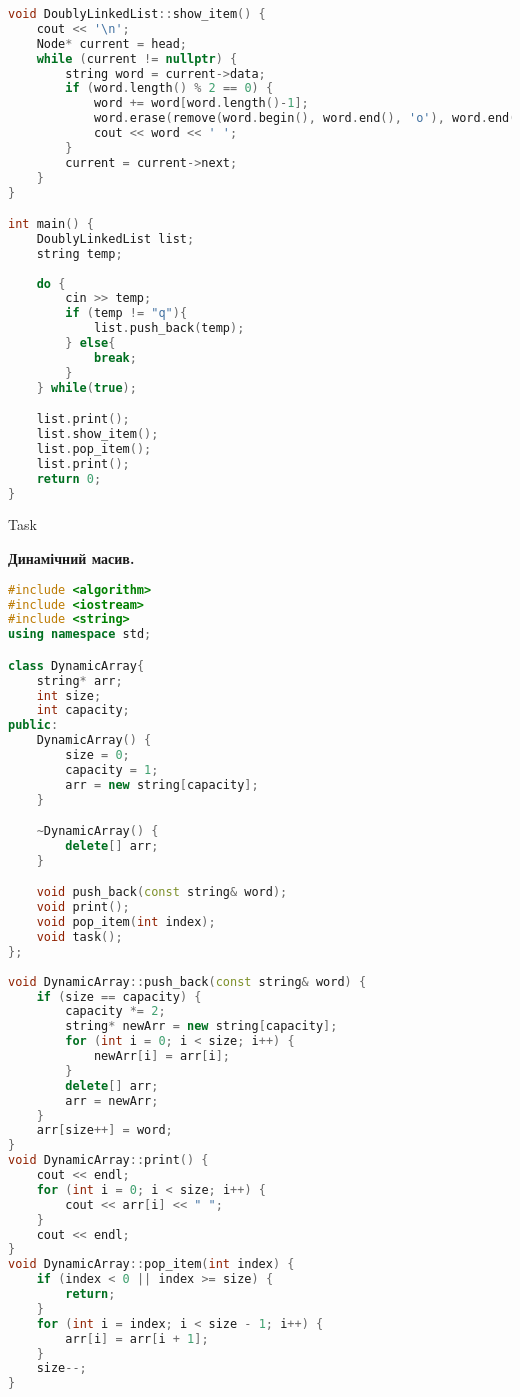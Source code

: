 \documentclass[a4paper,12pt]{article}
\newcommand{\RomanNumeralCaps}[1]{\MakeUppercase{\romannumeral #1}}
\begin{document}
\newpage
    \begin{lstlisting}[language=C++]
void DoublyLinkedList::show_item() {
    cout << '\n';
    Node* current = head;
    while (current != nullptr) {
        string word = current->data;
        if (word.length() % 2 == 0) {
            word += word[word.length()-1];
            word.erase(remove(word.begin(), word.end(), 'o'), word.end());
            cout << word << ' ';
        }
        current = current->next;
    }
}    

int main() {
    DoublyLinkedList list;
    string temp;
    
    do {
        cin >> temp;
        if (temp != "q"){
            list.push_back(temp);
        } else{
            break;
        }
    } while(true);

    list.print();
    list.show_item();
    list.pop_item();
    list.print();
    return 0;
}
    \end{lstlisting}

\newpage
    \begin{center}
        \Large{Task \RomanNumeralCaps{2}}
    \end{center}
    \textbf{Динамічний масив.}
    \begin{lstlisting}[language=C++]
#include <algorithm>
#include <iostream>
#include <string>
using namespace std;

class DynamicArray{
    string* arr;
    int size;
    int capacity;
public:
    DynamicArray() {
        size = 0;
        capacity = 1;
        arr = new string[capacity];
    }

    ~DynamicArray() {
        delete[] arr;
    }

    void push_back(const string& word);
    void print();
    void pop_item(int index);
    void task();
};
    
void DynamicArray::push_back(const string& word) {
    if (size == capacity) {
        capacity *= 2;
        string* newArr = new string[capacity];
        for (int i = 0; i < size; i++) {
            newArr[i] = arr[i];
        }
        delete[] arr;
        arr = newArr;
    }
    arr[size++] = word;
}
void DynamicArray::print() {
    cout << endl;
    for (int i = 0; i < size; i++) {
        cout << arr[i] << " ";
    }
    cout << endl;
}
void DynamicArray::pop_item(int index) {
    if (index < 0 || index >= size) {
        return;
    }
    for (int i = index; i < size - 1; i++) {
        arr[i] = arr[i + 1];
    }
    size--;
}
    \end{lstlisting}
\end{document}
